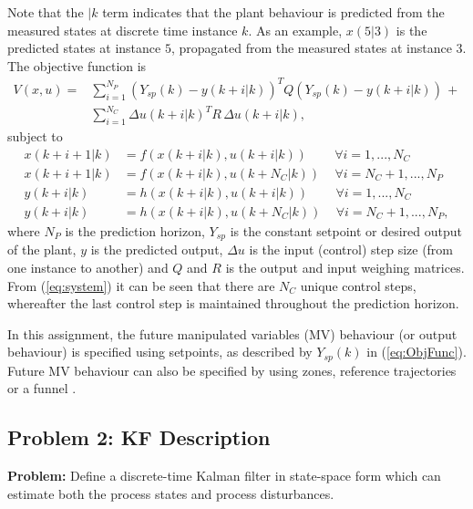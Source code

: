 \documentclass[12pt]{article}
\begin{document}
Note that the $ |k $ term indicates that the plant behaviour is predicted from the measured states at discrete time instance $ k $. As an example, $ x(5|3) $ is the predicted states at instance $5$, propagated from the measured states at instance $3$. The objective function is
\begin{equation}
\begin{aligned}
V(x,u) = &\sum_{i=1}^{N_P} (Y_{sp}(k)-y(k+i|k))^T Q (Y_{sp}(k)-y(k+i|k)) \,+\\ &\sum_{i=1}^{N_C} \Delta u(k+i|k)^T R \,\Delta u(k+i|k), \label{eq:ObjFunc}
\end{aligned}
\end{equation}
subject to
\begin{subequations}
\begin{align}
x(k+i+1|k) &= f(x(k+i|k),u(k+i|k)) \qquad \, \forall i = 1,...,N_C\\
x(k+i+1|k) &= f(x(k+i|k),u(k+N_C|k)) \, \quad \forall i = N_C+1,...,N_P\\
y(k+i|k) &= h(x(k+i|k),u(k+i|k)) \qquad \, \forall i = 1,...,N_C\\
y(k+i|k) &= h(x(k+i|k),u(k+N_C|k)) \, \quad \forall i = N_C+1,...,N_P, 
\end{align} \label{eq:system}
\end{subequations}
where $ N_P $ is the prediction horizon, $ Y_{sp} $ is the constant setpoint or desired output of the plant, $ y $ is the predicted output, $ \Delta u $ is the input (control) step size (from one instance to another) and $Q$ and $R$ is the output and input weighing matrices. From (\ref{eq:system}) it can be seen that there are $N_C$ unique control steps, whereafter the last control step is maintained throughout the prediction horizon.

In this assignment, the future manipulated variables (MV) behaviour (or output behaviour) is specified using setpoints, as described by $ Y_{sp}(k) $ in (\ref{eq:ObjFunc}). Future MV behaviour can also be specified by using zones, reference trajectories or a funnel \cite{Qin.2003}.

\subsection{Problem 2: KF Description}
\label{sec:KFDescription}

\textbf{Problem:} Define a discrete-time Kalman filter in state-space form which can estimate both the process	states and process disturbances. \\
\end{document}
